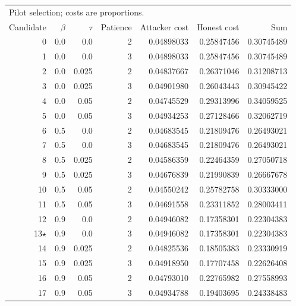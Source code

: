 \begin{tabular}{rrrrrrr}
\toprule
\multicolumn{7}{l}{Pilot selection; costs are proportions.} \\
Candidate & $\beta$ & $\tau$ & Patience & Attacker cost & Honest cost & Sum \\
\midrule
0 & 0.0 & 0.0 & 2 & 0.04898033 & 0.25847456 & 0.30745489 \\
1 & 0.0 & 0.0 & 3 & 0.04898033 & 0.25847456 & 0.30745489 \\
2 & 0.0 & 0.025 & 2 & 0.04837667 & 0.26371046 & 0.31208713 \\
3 & 0.0 & 0.025 & 3 & 0.04901980 & 0.26043443 & 0.30945422 \\
4 & 0.0 & 0.05 & 2 & 0.04745529 & 0.29313996 & 0.34059525 \\
5 & 0.0 & 0.05 & 3 & 0.04934253 & 0.27128466 & 0.32062719 \\
6 & 0.5 & 0.0 & 2 & 0.04683545 & 0.21809476 & 0.26493021 \\
7 & 0.5 & 0.0 & 3 & 0.04683545 & 0.21809476 & 0.26493021 \\
8 & 0.5 & 0.025 & 2 & 0.04586359 & 0.22464359 & 0.27050718 \\
9 & 0.5 & 0.025 & 3 & 0.04676839 & 0.21990839 & 0.26667678 \\
10 & 0.5 & 0.05 & 2 & 0.04550242 & 0.25782758 & 0.30333000 \\
11 & 0.5 & 0.05 & 3 & 0.04691558 & 0.23311852 & 0.28003411 \\
12 & 0.9 & 0.0 & 2 & 0.04946082 & 0.17358301 & 0.22304383 \\
13$\star$ & 0.9 & 0.0 & 3 & 0.04946082 & 0.17358301 & 0.22304383 \\
14 & 0.9 & 0.025 & 2 & 0.04825536 & 0.18505383 & 0.23330919 \\
15 & 0.9 & 0.025 & 3 & 0.04918950 & 0.17707458 & 0.22626408 \\
16 & 0.9 & 0.05 & 2 & 0.04793010 & 0.22765982 & 0.27558993 \\
17 & 0.9 & 0.05 & 3 & 0.04934788 & 0.19403695 & 0.24338483 \\
\bottomrule
\end{tabular}
